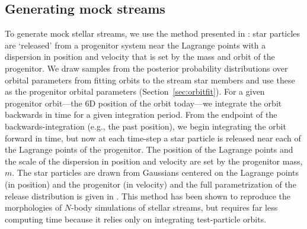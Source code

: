\documentclass[letterpaper,12pt,preprint]{aastex}
\begin{document}

\subsection{Generating mock streams}\label{sec:mocks}

To generate mock stellar streams, we use the method presented in \citep{fardal14}: star particles are `released' from a progenitor system near the Lagrange points with a dispersion in position and velocity that is set by the mass and orbit of the progenitor. We draw samples from the posterior probability distributions over orbital parameters from fitting orbits to the stream star members and use these as the progenitor orbital parameters (Section~\ref{sec:orbitfit}). For a given progenitor orbit---the 6D position of the orbit today---we integrate the orbit backwards in time for a given integration period. From the endpoint of the backwards-integration (e.g., the past position), we begin integrating the orbit forward in time, but now at each time-step a star particle is released near each of the Lagrange points of the progenitor. The position of the Lagrange points and the scale of the dispersion in position and velocity are set by the progenitor mass, $m$. The star particles are drawn from Gaussians centered on the Lagrange points (in position) and the progenitor (in velocity) and the full parametrization of the release distribution is given in \cite{fardal14}. This method has been shown to reproduce the morphologies of $N$-body simulations of stellar streams, but requires far less computing time because it relies only on integrating test-particle orbits. 
\end{document}
